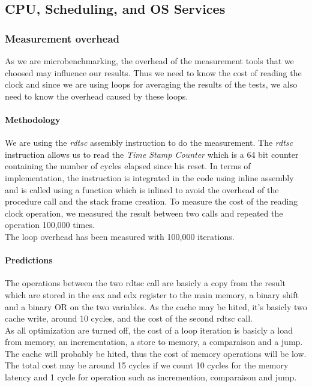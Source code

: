 \subsection{CPU, Scheduling, and OS Services}

\subsubsection{Measurement overhead}

As we are microbenchmarking, the overhead of the measurement tools that we
choosed may influence our results. Thus we need to know the cost of reading
the clock and since we are using loops for averaging the results of the tests, we
also need to know the overhead caused by these loops.

\paragraph{Methodology}
We are using the \emph{rdtsc} assembly instruction to do the measurement.
The \emph{rdtsc} instruction allows us to read the \emph{Time Stamp Counter}
which is a 64 bit counter containing the number of cycles elapsed since his
reset.
In terms of implementation, the instruction is integrated in the code using
inline assembly and is called using a function which is inlined to avoid the
overhead of the procedure call and the stack frame creation.
To measure the cost of the reading clock operation, we measured the result between
two calls and repeated the operation 100,000 times.\\

The loop overhead has been measured with 100,000 iterations.

\paragraph{Predictions}
The operations between the two rdtsc call are basicly a copy from the result
which are stored in the eax and edx register to the main memory, a binary shift
and a binary OR on the two variables.
As the cache may be hited, it's basicly two cache write, around 10 cycles, and
the cost of the second rdtsc call.\\

As all optimization are turned off, the cost of a loop iteration is basicly a
load from memory, an incrementation, a store to memory, a comparaison and a
jump.
The cache will probably be hited, thus the cost of memory operations will be low.
The total cost may be around 15 cycles if we count 10 cycles for the memory
latency and 1 cycle for operation such as incremention, comparaison and
jump.\\


